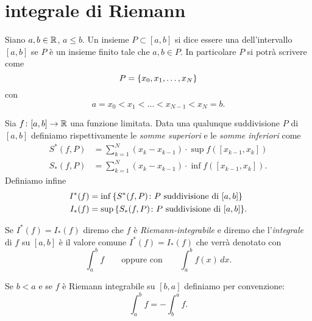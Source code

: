 \section{integrale di Riemann}

\begin{definition}
\mymark{***}
Siano $a,b\in \mathbb R$, $a \le b$.
Un insieme $P\subset [a,b]$ si dice essere una 
dell'intervallo $[a,b]$ se $P$ è un insieme finito tale che $a,b\in P$.
In particolare $P$ si
potrà scrivere come
\[
 P = {\left\{  x_0, x_1, \dots, x_N \right\}}
\]
con
\[
  a = x_0 < x_1 < \dots < x_{N-1} < x_N = b.
\]

Sia $f\colon [a,b] \to \mathbb R$ una funzione limitata.
Data una qualunque suddivisione $P$ di $[a,b]$ definiamo
rispettivamente le \emph{somme superiori} e le \emph{somme inferiori}
come
\begin{align*}
S^*(f,P)
&= \sum_{k=1}^N (x_k - x_{k-1}) \cdot \sup f([x_{k-1},x_k]) \\
S_*(f,P)
&= \sum_{k=1}^N (x_k - x_{k-1}) \cdot \inf f([x_{k-1},x_k]).
\end{align*}
Definiamo infine
\begin{align*}
  I^*(f) &= \inf {\left\{ S^*(f,P) \colon \text{$P$ suddivisione di $[a,b]$} \right\}}
  \\
  I_*(f) &= \sup {\left\{ S_*(f,P) \colon \text{$P$ suddivisione di $[a,b]$} \right\}}.
\end{align*}

Se $I^*(f) = I_*(f)$ diremo che $f$ è
\emph{Riemann-integrabile}
%
%
%
%
%
e diremo che l'\emph{integrale} di $f$ su $[a,b]$ è
il valore comune $I^*(f)=I_*(f)$ che verrà denotato con
\[
  \int_a^b f
  \qquad{\text{oppure con}} \qquad
  \int_a^b f(x)\, dx.
\]

Se $b<a$ e se $f$ è Riemann integrabile su $[b,a]$
definiamo per convenzione:
\[
  \int_a^b f = -\int_b^a f.
\]
\end{definition}

